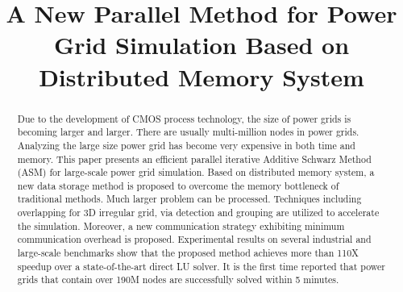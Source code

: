 \documentclass{sig-alternate}
\begin{document}
\title{A New Parallel Method for Power Grid Simulation Based on Distributed Memory System}

\maketitle

\begin{comment}
This paper presents an efficient parallel Domain Decomposition method for large-scale power grid simulation. 
Based on multi-core platform, a new data storage strategy is proposed to overcome the memory bottleneck of traditional methods. 
Techniques as 3D irregular grid friendly overlapping, via detection as well as grouping techniques are utilized to accelerate the 
simulation. A new communication strategy is proposed and exhibits minimum communication overhead. Experimental results on several 
industrial and large-scale benchmarks show that the proposed method achieves more than 110X speedup over a state-of-the-art direct 
LU solver. Power grid containing over 190M nodes could be solved within 5 minutes.
\end{comment}

\begin{abstract}
Due to the development of CMOS process technology, the size of power grids is becoming larger and larger. There are usually 
multi-million nodes in power grids. Analyzing the large size power grid has become very expensive in both time and memory. This paper 
presents an efficient parallel iterative Additive Schwarz Method (ASM) for large-scale power grid simulation. Based on distributed 
memory system, a new 
data storage method is proposed to overcome the memory bottleneck of traditional methods. Much larger problem can be processed. 
Techniques including overlapping for 3D irregular grid, via detection and grouping are utilized to accelerate the 
simulation. Moreover, a new communication strategy exhibiting minimum communication overhead is proposed. Experimental results on 
several 
industrial and large-scale benchmarks show that the proposed method achieves more than 110X speedup over a state-of-the-art direct 
LU solver. It is the first time reported that power grids that contain over 190M nodes are successfully solved within 5 minutes.	
\end{abstract}
\end{document}
